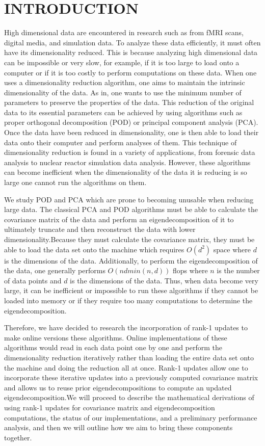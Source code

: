 \documentclass[onecolumn]{webofc}
\begin{document}
\section{INTRODUCTION}
\label{intro}
High dimensional data are encountered in research such as from fMRI scans, digital media, and simulation data. To analyze these data efficiently, it must often have its dimensionality reduced. This is because analyzing high dimensional data can be impossible or very slow, for example, if it is too large to load onto a computer or if it is too costly to perform computations on these data. When one uses a dimensionality reduction algorithm, one aims to maintain the intrinsic dimensionality of the data. As in, one wants to use the minimum number of parameters to preserve the properties of the data\cite{RefA}. This reduction of the original data to its essential parameters can be achieved by using algorithms such as proper orthogonal decomposition (POD) or principal component analysis (PCA). Once the data have been reduced in dimensionality, one is then able to load their data onto their computer and perform analyses of them. This technique of dimensionality reduction is found in a variety of applications, from forensic data analysis to nuclear reactor simulation data analysis\cite{RefIntro}. However, these algorithms can become inefficient when the dimensionality of the data it is reducing is so large one cannot run the algorithms on them.

We study POD and PCA which are prone to becoming unusable when reducing large data. The classical PCA and POD algorithms must be able to calculate the covariance matrix of the data and perform an eigendecomposition of it to ultimately truncate and then reconstruct the data with lower dimensionality\cite{RefB, RefC}.Because they must calculate the covariance matrix, they must be able to load the data set onto the machine which requires $O(d^2)$ space where $d$ is the dimensions of the data. Additionally, to perform the eigendecomposition of the data, one generally performs $O(ndmin(n, d))$ flops where $n$ is the number of data points and $d$ is the dimensions of the data.\cite{RefB} Thus, when data become very large, it can be inefficient or impossible to run these algorithms if they cannot be loaded into memory or if they require too many computations to determine the eigendecomposition.

Therefore, we have decided to research the incorporation of rank-1 updates to make online versions these algorithms. Online implementations of these algorithms would read in each data point one by one and perform the dimensionality reduction iteratively rather than loading the entire data set onto the machine and doing the reduction all at once. Rank-1 updates allow one to incorporate these iterative updates into a previously computed covariance matrix and allows us to reuse prior eigendecompositions to compute an updated eigendecomposition\cite{RefB}.We will proceed to describe the mathematical derivations of using rank-1 updates for covariance matrix and eigendecomposition computations, the status of our implementations, and a preliminary performance analysis, and then we will outline how we aim to bring these components together.
\end{document}

